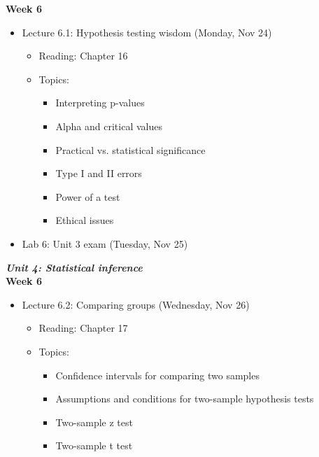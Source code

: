 \documentclass[11pt]{article}
\begin{document}
\textbf{Week 6}
\begin{itemize}
    \item Lecture 6.1: Hypothesis testing wisdom (Monday, Nov 24)
    \begin{itemize}
        \item Reading: Chapter 16
        \item Topics: 
        \begin{itemize}
            \item Interpreting p-values
            \item Alpha and critical values
            \item Practical vs. statistical significance
            \item Type I and II errors
            \item Power of a test
            \item Ethical issues
        \end{itemize}
    \end{itemize}
    \item Lab 6: Unit 3 exam (Tuesday, Nov 25)
\end{itemize}





\Large \textit{\textbf{Unit 4: Statistical inference}} \\

\large \textbf{Week 6}

\begin{itemize}
    \item Lecture 6.2: Comparing groups (Wednesday, Nov 26)
    \begin{itemize}
        \item Reading: Chapter 17
        \item Topics:
        \begin{itemize}
            \item Confidence intervals for comparing two samples
            \item Assumptions and conditions for two-sample hypothesis tests
            \item Two-sample z test
            \item Two-sample t test
        \end{itemize}
    \end{itemize}
\end{itemize}
\end{document}
